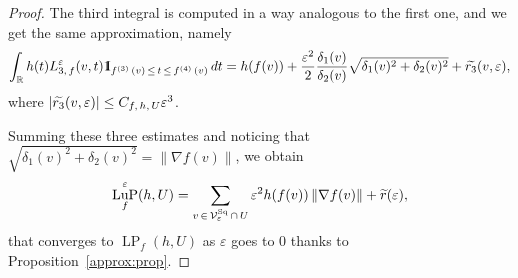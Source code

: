 \documentclass[AHL,Unicode,longabstracts,published]{cedram}
\newcommand{\R}{\mathbb{R}}
\newcommand{\ind}{{1\!\!\mathrm{I}}}
\newcommand{\eps}{\varepsilon}
\DeclareMathOperator{\LP}{LP}
\DeclareMathOperator{\LuP}{LuP}
\DeclareMathOperator{\Sq}{Sq}
\newcommand{\calV}{\mathcal{V}}
\let\oldtilde\tilde
\renewcommand*{\tilde}[1]{\mathchoice{\widetilde{#1}}{\widetilde{#1}}{\oldtilde{#1}}{\oldtilde{#1}}}
\begin{document}
\begin{proof}
The third integral is computed in a way analogous to the first one, and we get the same approximation, namely
\[
\int_\R h(t)
L_{3,\,f}^\eps(v,t) \ind_{f^{(3)}\,(v)\,\leq\,t\,\leq\,f^{(4)}\,(v)} \, dt = h(f(v)) + \frac{\eps^2}{2} \frac{\delta_1(v)}{\delta_2(v)}
\sqrt{\delta_1(v)^2 + \delta_2(v)^2} + \tilde{r_3}(v,\eps),
\]
where
$|\tilde{r_3}(v,\eps)|\leq C_{f,\,h,\,U} \eps^3$.

Summing these three estimates and noticing that $\sqrt{\delta_1(v)^2 +
\delta_2(v)^2} = \| \nabla f(v) \| $, we obtain
\[
\LuP_f^\eps(h,U) = \sum_{v\,\in\,\calV^{\Sq}_\eps\,\cap\,U} \eps^2 h(f(v)) \left\| \nabla f(v)\right\|
+ \tilde{r}(\eps),
\]
that converges to $ \LP_f(h,U)$ as $\eps$ goes to $0$ thanks to Proposition~\ref{approx:prop}.
\end{proof}

\newpage

\end{document}
